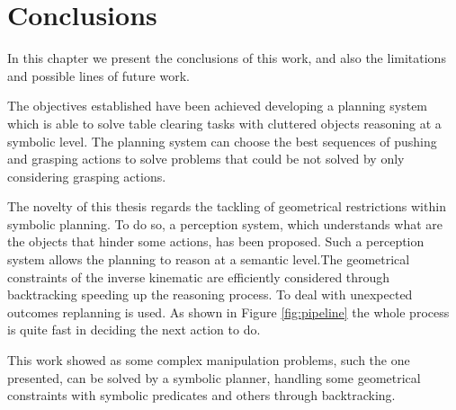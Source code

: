 \chapter{Conclusions}
\label{ch:conclusions}

In this chapter we present the conclusions of this work, and also the limitations and possible lines of future work.

The objectives established have been achieved developing a planning system which is able to solve table clearing tasks with cluttered objects reasoning at a symbolic level. The planning system can choose the best sequences of pushing and grasping actions to solve problems that could be not solved by only considering grasping actions.

The novelty of this thesis regards the tackling of geometrical restrictions within symbolic planning. To do so, a perception system, which understands what are the objects that hinder some actions, has been proposed. Such a perception system allows the planning to reason at a semantic level.The geometrical constraints of the inverse kinematic are efficiently considered through backtracking speeding up the reasoning process. To deal with unexpected outcomes replanning is used. As shown in Figure \ref{fig:pipeline} the whole process is quite fast in deciding the next action to do. 

This work showed as some complex manipulation problems, such the one presented, can be solved by a symbolic planner, handling some geometrical constraints with symbolic predicates and others through backtracking.


